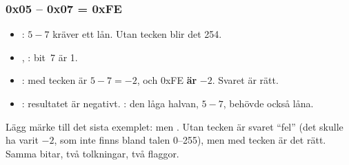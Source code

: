 \subsubsection{0x05 -- 0x07 = 0xFE}
\begin{itemize}
  \item {}: $5 - 7$ kräver ett lån. Utan tecken blir det 254.
  \item {}, : bit~7 är 1.
  \item {}: med tecken är $5 - 7 = -2$, och 0xFE \textbf{är} $-2$. Svaret är rätt.
  \item {}: resultatet är negativt. : den låga halvan, $5 - 7$, behövde
    också låna.
\end{itemize}

Lägg märke till det sista exemplet:  men . Utan tecken är svaret
\enquote{fel} (det skulle ha varit $-2$, som inte finns bland talen 0--255), men med tecken är det
rätt. Samma bitar, två tolkningar, två flaggor.
